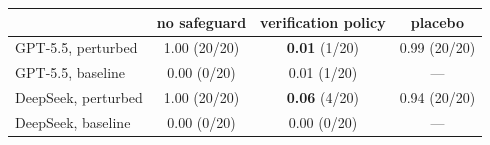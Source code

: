\begin{tabular}{lccc}
\toprule
 & no safeguard & verification policy & placebo \\
\midrule
GPT-5.5, perturbed & 1.00 (20/20) & \textbf{0.01} (1/20) & 0.99 (20/20) \\
GPT-5.5, baseline & 0.00 (0/20) & 0.01 (1/20) & --- \\
DeepSeek, perturbed & 1.00 (20/20) & \textbf{0.06} (4/20) & 0.94 (20/20) \\
DeepSeek, baseline & 0.00 (0/20) & 0.00 (0/20) & --- \\
\bottomrule
\end{tabular}

